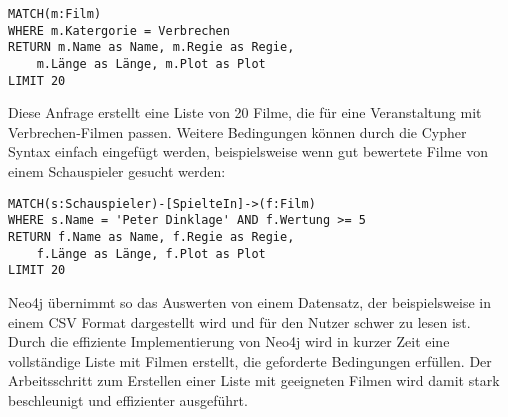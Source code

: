 \begin{Verbatim}[frame=single]
MATCH(m:Film) 
WHERE m.Katergorie = Verbrechen
RETURN m.Name as Name, m.Regie as Regie, 
	m.Länge as Länge, m.Plot as Plot 
LIMIT 20
\end{Verbatim}
Diese Anfrage erstellt eine Liste von 20 Filme, die für eine Veranstaltung mit Verbrechen-Filmen passen. Weitere Bedingungen können durch die Cypher Syntax einfach eingefügt werden, beispielsweise wenn gut bewertete Filme von einem Schauspieler gesucht werden:
\begin{Verbatim}[frame=single]
MATCH(s:Schauspieler)-[SpielteIn]->(f:Film) 
WHERE s.Name = 'Peter Dinklage' AND f.Wertung >= 5
RETURN f.Name as Name, f.Regie as Regie, 
	f.Länge as Länge, f.Plot as Plot 
LIMIT 20
\end{Verbatim}
Neo4j übernimmt so das Auswerten von einem Datensatz, der beispielsweise in einem CSV Format dargestellt wird und für den Nutzer schwer zu lesen ist. Durch die effiziente Implementierung von Neo4j wird in kurzer Zeit eine vollständige Liste mit Filmen erstellt, die geforderte Bedingungen erfüllen. Der Arbeitsschritt zum Erstellen einer Liste mit geeigneten Filmen wird damit stark beschleunigt und effizienter ausgeführt.
